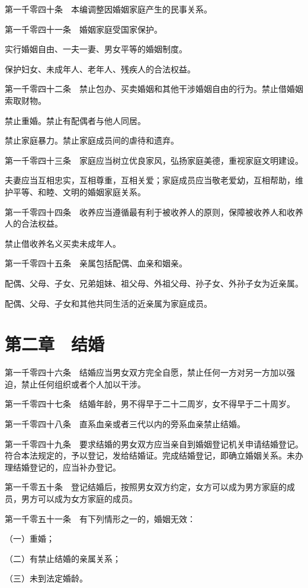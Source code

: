 \documentclass[UTF8,12pt,a4paper]{ctexbook}
\begin{document}
第一千零四十条　本编调整因婚姻家庭产生的民事关系。

第一千零四十一条　婚姻家庭受国家保护。

实行婚姻自由、一夫一妻、男女平等的婚姻制度。

保护妇女、未成年人、老年人、残疾人的合法权益。

第一千零四十二条　禁止包办、买卖婚姻和其他干涉婚姻自由的行为。禁止借婚姻索取财物。

禁止重婚。禁止有配偶者与他人同居。

禁止家庭暴力。禁止家庭成员间的虐待和遗弃。

第一千零四十三条　家庭应当树立优良家风，弘扬家庭美德，重视家庭文明建设。

夫妻应当互相忠实，互相尊重，互相关爱；家庭成员应当敬老爱幼，互相帮助，维护平等、和睦、文明的婚姻家庭关系。

第一千零四十四条　收养应当遵循最有利于被收养人的原则，保障被收养人和收养人的合法权益。

禁止借收养名义买卖未成年人。

第一千零四十五条　亲属包括配偶、血亲和姻亲。

配偶、父母、子女、兄弟姐妹、祖父母、外祖父母、孙子女、外孙子女为近亲属。

配偶、父母、子女和其他共同生活的近亲属为家庭成员。

\section*{第二章　结婚}

第一千零四十六条　结婚应当男女双方完全自愿，禁止任何一方对另一方加以强迫，禁止任何组织或者个人加以干涉。

第一千零四十七条　结婚年龄，男不得早于二十二周岁，女不得早于二十周岁。

第一千零四十八条　直系血亲或者三代以内的旁系血亲禁止结婚。

第一千零四十九条　要求结婚的男女双方应当亲自到婚姻登记机关申请结婚登记。符合本法规定的，予以登记，发给结婚证。完成结婚登记，即确立婚姻关系。未办理结婚登记的，应当补办登记。

第一千零五十条　登记结婚后，按照男女双方约定，女方可以成为男方家庭的成员，男方可以成为女方家庭的成员。

第一千零五十一条　有下列情形之一的，婚姻无效：

（一）重婚；

（二）有禁止结婚的亲属关系；

（三）未到法定婚龄。
\end{document}
